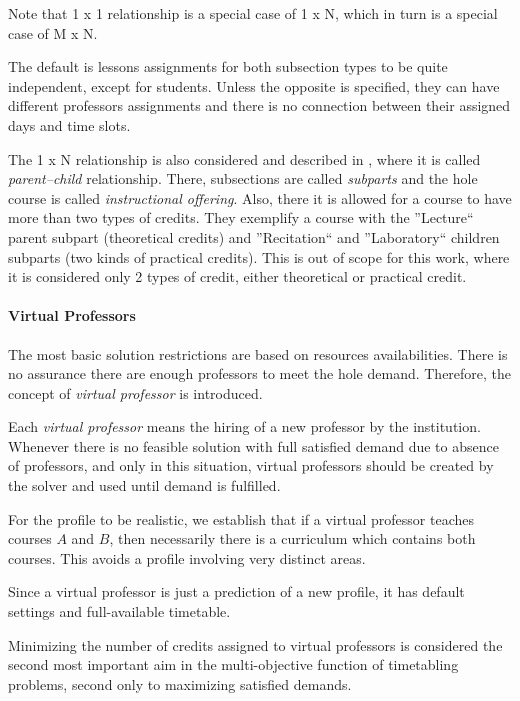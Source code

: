 Note that 1 x 1 relationship is a special case of 1 x N, which in turn is a special case of M x N.

The default is lessons assignments for both subsection types to be quite independent, except for students. Unless the opposite is specified, they can have different professors assignments and there is no connection between their assigned days and time slots.

The 1 x N relationship is also considered and described in \cite{Murray2007}, where it is called \textit{parent--child} relationship. There, subsections are called \textit{subparts} and the hole course is called \textit{instructional offering}. Also, there it is allowed for a course to have more than two types of credits. They exemplify a course with the ''Lecture`` parent subpart (theoretical credits) and ''Recitation`` and ''Laboratory`` children subparts (two kinds of practical credits). This is out of scope for this work, where it is considered only 2 types of credit, either theoretical or practical credit.


\paragraph{Virtual Professors}
\label{constrvirtprof}

The most basic solution restrictions are based on resources availabilities. There is no assurance there are enough professors to meet the hole demand. Therefore, the concept of \textit{virtual professor} is introduced.

Each \textit{virtual professor} means the hiring of a new professor by the institution. Whenever there is no feasible solution with full satisfied demand due to absence of professors, and only in this situation, virtual professors should be created by the solver and used until demand is fulfilled.

For the profile to be realistic, we establish that if a virtual professor teaches courses $A$ and $B$, then necessarily there is a curriculum which contains both courses. This avoids a profile involving very distinct areas. 

Since a virtual professor is just a prediction of a new profile, it has default settings and full-available timetable.

Minimizing the number of credits assigned to virtual professors is considered the second most important aim in the multi-objective function of timetabling problems, second only to maximizing satisfied demands.


